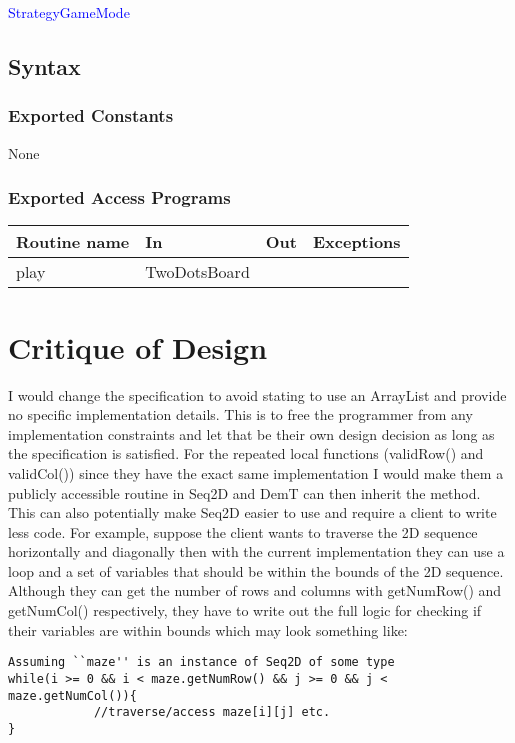 \documentclass[12pt]{article}
\begin{document}
\begin{itemize}
\begin{itemize}
\begin{itemize}
\noindent \textcolor{blue}{StrategyGameMode}

\subsection* {Syntax}

\subsubsection* {Exported Constants}

None

\subsubsection* {Exported Access Programs}

\begin{tabular}{| l | l | l | p{6cm} |}
\hline
\textbf{Routine name} & \textbf{In} & \textbf{Out} & \textbf{Exceptions}\\
\hline
play & TwoDotsBoard & & \\
\hline
\end{tabular}

\newpage


\section*{Critique of Design}


I would change the specification to avoid stating to use an ArrayList and provide no specific implementation details. This is to free the programmer from any implementation constraints and let that be their own design decision as long as the specification is satisfied. For the repeated local functions (validRow() and validCol()) since they have the exact same implementation I would make them a publicly accessible routine in Seq2D and DemT can then inherit the method. \\

This can also potentially make Seq2D easier to use and require a client to write less code. For example, suppose the client wants to traverse the 2D sequence horizontally and diagonally then with the current implementation they can use a loop and a set of variables that should be within the bounds of the 2D sequence. Although they can get the number of rows and columns with getNumRow() and getNumCol() respectively, they have to write out the full logic for checking if their variables are within bounds which may look something like:\\
\begin{verbatim}
Assuming ``maze'' is an instance of Seq2D of some type
while(i >= 0 && i < maze.getNumRow() && j >= 0 && j < maze.getNumCol()){
			//traverse/access maze[i][j] etc.
}
\end{verbatim}


\end{itemize}
\end{itemize}
\end{itemize}
\end{document}
